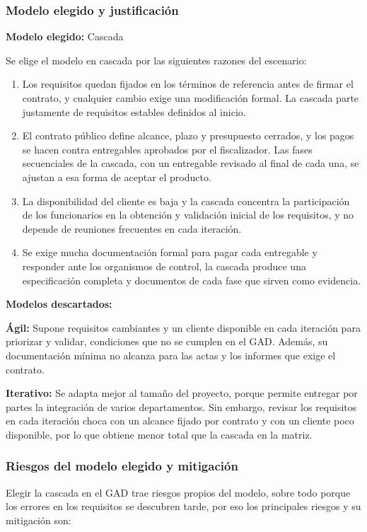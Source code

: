 \subsubsection{Modelo elegido y justificación}
\textbf{Modelo elegido:} Cascada

Se elige el modelo en cascada por las siguientes razones del escenario:

\begin{enumerate}
\item Los requisitos quedan fijados en los términos de referencia antes de firmar el contrato, y cualquier cambio exige una modificación formal. La cascada parte justamente de requisitos estables definidos al inicio.
\item El contrato público define alcance, plazo y presupuesto cerrados, y los pagos se hacen contra entregables aprobados por el fiscalizador. Las fases secuenciales de la cascada, con un entregable revisado al final de cada una, se ajustan a esa forma de aceptar el producto.
\item La disponibilidad del cliente es baja y la cascada concentra la participación de los funcionarios en la obtención y validación inicial de los requisitos, y no depende de reuniones frecuentes en cada iteración.
\item Se exige mucha documentación formal para pagar cada entregable y responder ante los organismos de control, la cascada produce una especificación completa y documentos de cada fase que sirven como evidencia.
\end{enumerate}

\textbf{Modelos descartados:}

\textbf{Ágil:} Supone requisitos cambiantes y un cliente disponible en cada iteración para priorizar y validar, condiciones que no se cumplen en el GAD. Además, su documentación mínima no alcanza para las actas y los informes que exige el contrato.

\textbf{Iterativo:} Se adapta mejor al tamaño del proyecto, porque permite entregar por partes la integración de varios departamentos. Sin embargo, revisar los requisitos en cada iteración choca con un alcance fijado por contrato y con un cliente poco disponible, por lo que obtiene menor total que la cascada en la matriz.

\subsubsection{Riesgos del modelo elegido y mitigación}
Elegir la cascada en el GAD trae riesgos propios del modelo, sobre todo porque los errores en los requisitos se descubren tarde, por eso los principales riesgos y su mitigación son:

